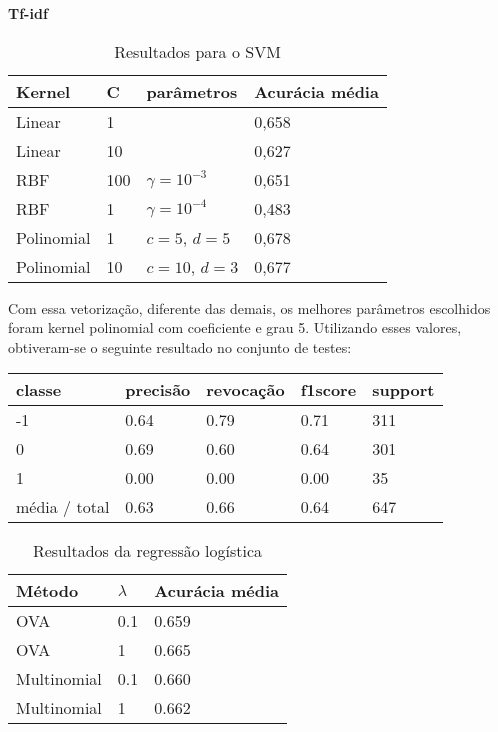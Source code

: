 \textbf{Tf-idf}

\begin{table}[H]
	\centering
	\caption{Resultados para o SVM}
	\begin{tabular}{l l l l}
		\hline
		Kernel & C & parâmetros & Acurácia média \\
		\hline
		Linear & 1 & & 0,658 \\
		\hline
		Linear & 10 & & 0,627 \\
		\hline
		RBF & 100 & $\gamma = 10^{-3}$ & 0,651 \\
		\hline
		RBF & 1 & $\gamma = 10^{-4}$ & 0,483 \\
		\hline
		Polinomial & 1 & $c = 5$, $d = 5$ & 0,678 \\
		\hline
		Polinomial & 10 & $c = 10$, $d = 3$ & 0,677 \\
		\hline
	\end{tabular}
\end{table}

Com essa vetorização, diferente das demais, os melhores parâmetros escolhidos foram kernel polinomial
com coeficiente e grau 5. Utilizando esses valores, obtiveram-se o seguinte resultado no conjunto de
testes:

\begin{table}[H]
	\centering
		\begin{tabular}{l | l | l | l | l}
		\hline
		classe  	&	precisão  &  revocação &  f1\-score &  support \\
		\hline
		 -1    &   0.64   &   0.79   &   0.71   &    311 \\
		 \hline
          0    &   0.69   &   0.60  &    0.64    &   301 \\
          \hline
          1   &    0.00   &   0.00   &   0.00    &    35 \\
          \hline
		média / total   &    0.63   &   0.66   &   0.64   &    647 \\
		\hline
	\end{tabular}
\end{table}

\begin{table}[H]
	\centering
	\caption{Resultados da regressão logística}
	\begin{tabular}{l l l}
		\hline
		Método & $\lambda$ & Acurácia média \\
		\hline
		OVA & 0.1 & 0.659 \\
		\hline
		OVA & 1 & 0.665 \\
		\hline
		Multinomial & 0.1 & 0.660 \\
		\hline
		Multinomial & 1 & 0.662 \\
		\hline
	\end{tabular}
\end{table}


